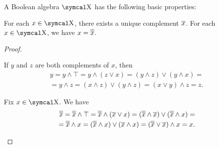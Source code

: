 \begin{Proposition}\label{thm:boolean_algebra_properties}
  A Boolean algebra \( \CX \) has the following basic properties:
  \begin{PropEnum}
     For each \( x \in \CX \), there exists a unique complement \( \overline{x} \).
     For each \( x \in \CX \), we have \( x = \overline{\overline{x}} \).
  \end{PropEnum}
\end{Proposition}
\begin{proof}\mbox{}
  \begin{itemize}
     If \( y \) and \( z \) are both complements of \( x \), then
    \begin{align*}
      y
      =
      y \wedge \top
      =
      y \wedge (z \vee x)
      =
      (y \wedge z) \vee (y \wedge x)
      = \\ =
      y \wedge z
      =
      (x \wedge z) \vee (y \wedge z)
      =
      (x \vee y) \wedge z
      =
      z.
    \end{align*}

     Fix \( x \in \CX \). We have
    \begin{align*}
      \overline{\overline{x}}
      =
      \overline{\overline{x}} \wedge \top
      =
      \overline{\overline{x}} \wedge (\overline{x} \vee x)
      =
      (\overline{\overline{x}} \wedge \overline{x}) \vee (\overline{\overline{x}} \wedge x)
      = \\ =
      \overline{\overline{x}} \wedge x
      =
      (\overline{\overline{x}} \wedge x) \vee (\overline{x} \wedge x)
      =
      (\overline{\overline{x}} \vee \overline{x}) \wedge x
      =
      x.
    \end{align*}
  \end{itemize}
\end{proof}


